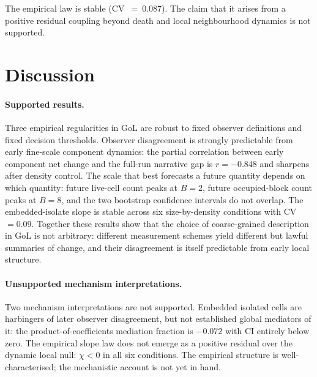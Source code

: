 \documentclass[11pt,a4paper]{article}
\begin{document}
The empirical law is stable (CV~$=~0.087$).
The claim that it arises from a positive residual coupling beyond death and
local neighbourhood dynamics is not supported.

\section{Discussion}
\label{sec:disc}

\paragraph{Supported results.}
Three empirical regularities in GoL are robust to fixed observer definitions
and fixed decision thresholds.
Observer disagreement is strongly predictable from early fine-scale component
dynamics: the partial correlation between early component net change and the
full-run narrative gap is $r=-0.848$ and sharpens after density control.
The scale that best forecasts a future quantity depends on which quantity:
future live-cell count peaks at $B=2$, future occupied-block count peaks at
$B=8$, and the two bootstrap confidence intervals do not overlap.
The embedded-isolate slope is stable across six size-by-density conditions
with CV~$=0.09$.
Together these results show that the choice of coarse-grained description
in GoL is not arbitrary: different measurement schemes yield different but
lawful summaries of change, and their disagreement is itself predictable from
early local structure.

\paragraph{Unsupported mechanism interpretations.}
Two mechanism interpretations are not supported.
Embedded isolated cells are harbingers of later observer disagreement, but
not established global mediators of it: the product-of-coefficients mediation
fraction is $-0.072$ with CI entirely below zero.
The empirical slope law does not emerge as a positive residual over the
dynamic local null: $\chi < 0$ in all six conditions.
The empirical structure is well-characterised; the mechanistic account is not
yet in hand.
\end{document}
